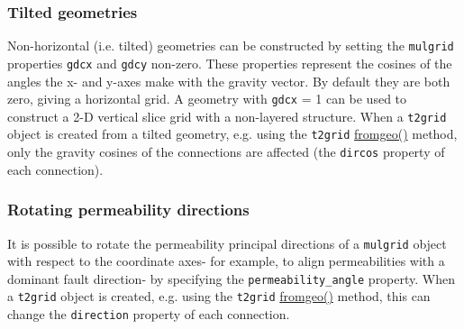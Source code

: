 \subsubsection{Tilted geometries}

Non-horizontal (i.e. tilted) geometries can be constructed by setting the \texttt{mulgrid} properties \texttt{gdcx} and \texttt{gdcy} non-zero. These properties represent the cosines of the angles the x- and y-axes make with the gravity vector. By default they are both zero, giving a horizontal grid. A geometry with \texttt{gdcx} = 1 can be used to construct a 2-D vertical slice grid with a non-layered structure. When a \texttt{t2grid} object is created from a tilted geometry, e.g. using the \texttt{t2grid} \hyperref[sec:t2grid:fromgeo]{fromgeo()} method, only the gravity cosines of the connections are affected (the \texttt{dircos} property of each connection).

\subsubsection{Rotating permeability directions}

It is possible to rotate the permeability principal directions of a \texttt{mulgrid} object with respect to the coordinate axes- for example, to align permeabilities with a dominant fault direction- by specifying the \texttt{permeability\_angle} property. When a \texttt{t2grid} object is created, e.g. using the \texttt{t2grid} \hyperref[sec:t2grid:fromgeo]{fromgeo()} method, this can change the \texttt{direction} property of each connection.

